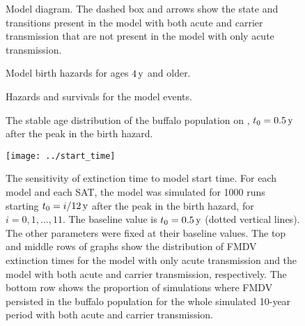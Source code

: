 \documentclass[12pt, USenglish]{article}  %
\begin{document}
\begin{figure}
  \centering
  \textsf{}
  \caption{Model diagram. The dashed box and arrows show the
   state and transitions present in the model with both acute and
   carrier transmission that are not present in the model with only
    acute transmission.}
\end{figure}

\begin{figure}
  \centering
  \begin{sansmath}
    
  \end{sansmath}
  \caption{Model birth hazards for ages $\unit[4]{y}$ and older.}
\end{figure}

\begin{figure}
  \centering
  \begin{sansmath}
    
  \end{sansmath}
  \caption{Hazards and survivals for the model events.}
\end{figure}

\begin{figure}
  \centering
  \begin{sansmath}
    
  \end{sansmath}
  \caption{The stable age distribution of the buffalo population
    on {\printyearoff{}}, $t_0 = \unit[0.5]{y}$
    after the peak in the birth hazard.}
\end{figure}

\begin{figure}
  \centering
  \texttt{[image: ../start\_time]}
  \caption{The sensitivity of extinction time to model start time.
    For each model and each SAT, the model was simulated for
    1000 runs starting $t_0 = \unit[i / 12]{y}$ after the peak in the
    birth hazard, for $i = 0, 1, \dots, 11$. The baseline value is
    $t_0 = \unit[0.5]{y}$ (dotted vertical lines). The other
    parameters were fixed at their baseline values. The top and middle
    rows of graphs show the distribution of FMDV extinction times for
    the model with only acute transmission and the model with both
    acute and carrier transmission, respectively. The bottom row shows
    the proportion of simulations where FMDV persisted in the buffalo
    population for the whole simulated 10-year period with both acute
    and carrier transmission.}
\end{figure}
\end{document}
